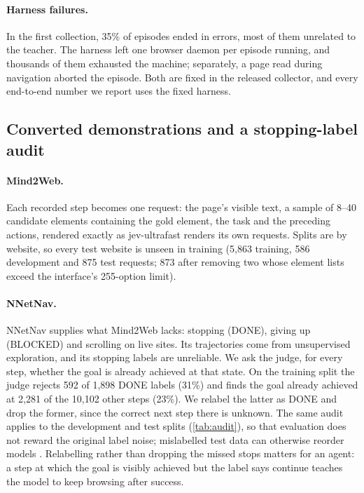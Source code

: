 \documentclass{article}
\begin{document}
\paragraph{Harness failures.} In the first collection, 35\% of episodes ended in errors, most of them unrelated to the
teacher. The harness left one browser daemon per episode running, and thousands of them exhausted the machine;
separately, a page read during navigation aborted the episode. Both are fixed in the released collector, and every end-to-end number we
report uses the fixed harness.

\subsection{Converted demonstrations and a stopping-label audit}
\label{sec:convert}

\paragraph{Mind2Web.} Each recorded step becomes one request: the page's visible text, a sample of 8--40 candidate
elements containing the gold element, the task and the preceding actions, rendered exactly as jev-ultrafast renders its
own requests. Splits are by website, so every test website is unseen in training (5{,}863 training, 586 development and
875 test requests; 873 after removing two whose element lists exceed the interface's 255-option limit).

\paragraph{NNetNav.} NNetNav \citep{murty2024nnetnav} supplies what Mind2Web lacks: stopping (DONE), giving up (BLOCKED)
and scrolling on live sites. Its trajectories come from unsupervised exploration, and its stopping labels are
unreliable. We ask the judge, for every step, whether the goal is already achieved at that state. On the training split
the judge rejects 592 of 1{,}898 DONE labels (31\%) and finds the goal already achieved at 2{,}281 of the 10{,}102 other
steps (23\%). We relabel the latter as DONE and drop the former, since the correct next step there is unknown. The same audit applies
to the development and test splits (\cref{tab:audit}), so that evaluation does not reward the original label noise;
mislabelled test data can otherwise reorder models \citep{northcutt2021pervasive}. Relabelling rather than dropping the
missed stops matters for an agent: a step at which the goal is visibly achieved but the label says continue teaches the
model to keep browsing after success.
\end{document}
